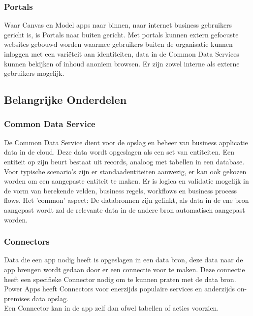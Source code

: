 \subsubsection{Portals}

Waar Canvas en Model apps naar binnen, naar internet business gebruikers gericht is, is Portals naar buiten gericht. Met portals kunnen extern gefocuste websites gebouwd worden waarmee gebruikers buiten de organisatie kunnen inloggen met een variëteit aan identiteiten, data in de Common Data Services kunnen bekijken of inhoud anoniem browsen. Er zijn zowel interne als externe gebruikers mogelijk. \autocite{MicrosoftDocs2020a}

\subsection{Belangrijke Onderdelen}

\subsubsection{Common Data Service}

De Common Data Service dient voor de opslag en beheer van business applicatie data in de cloud. Deze data wordt opgeslagen als een set van entiteiten. Een entiteit op zijn beurt bestaat uit records, analoog met tabellen in een database. Voor typische scenario's zijn er standaadentiteiten aanwezig, er kan ook gekozen worden om een aangepaste entiteit te maken. Er is logica en validatie mogelijk in de vorm van berekende velden, business regels, workflows en business process flows. Het 'common' aspect: De databronnen zijn gelinkt, als data in de ene bron aangepast wordt zal de relevante data in de andere bron automatisch aangepast worden. \autocite{MicrosoftDocs2019a}

\subsubsection{Connectors}

Data die een app nodig heeft is opgeslagen in een data bron, deze data naar de app brengen wordt gedaan door er een connectie voor te maken. Deze connectie heeft een specifieke Connector nodig om te kunnen praten met de data bron. Power Apps heeft Connectors voor enerzijds populaire services en anderzijds on-premises data opslag. \\
Een Connector kan in de app zelf dan ofwel tabellen of acties voorzien.

